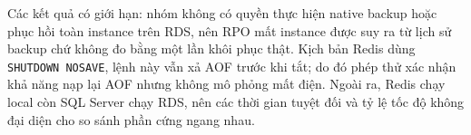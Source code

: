 Các kết quả có giới hạn: nhóm không có quyền thực hiện native backup hoặc phục hồi toàn instance trên RDS, nên RPO mất instance được suy ra từ lịch sử backup chứ không đo bằng một lần khôi phục thật. Kịch bản Redis dùng \texttt{SHUTDOWN NOSAVE}, lệnh này vẫn xả AOF trước khi tắt; do đó phép thử xác nhận khả năng nạp lại AOF nhưng không mô phỏng mất điện. Ngoài ra, Redis chạy local còn SQL Server chạy RDS, nên các thời gian tuyệt đối và tỷ lệ tốc độ không đại diện cho so sánh phần cứng ngang nhau.
